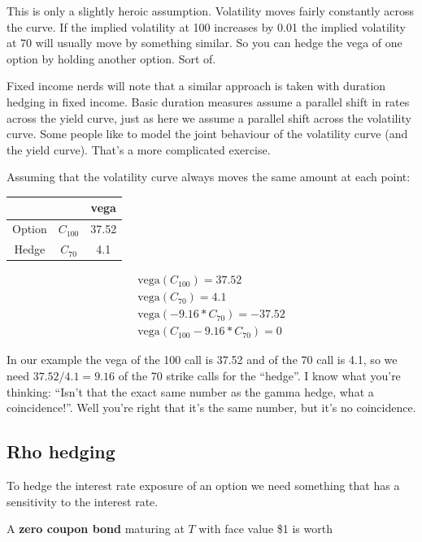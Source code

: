This is only a slightly heroic assumption. Volatility moves fairly constantly across the curve. If the implied volatility at 100 increases by 0.01 the implied volatility at 70 will usually move by something similar. So you can hedge the vega of one option by holding another option. Sort of.

Fixed income nerds will note that a similar approach is taken with duration hedging in fixed income. Basic duration measures assume a parallel shift in rates across the yield curve, just as here we assume a parallel shift across the volatility curve. Some people like to model the joint behaviour of the volatility curve (and the yield curve). That's a more complicated exercise.

Assuming that the volatility curve always moves the same amount at each point:

\begin{center}
\begin{tabular}{|c|cc|}
\hline
 & & vega\\
\hline
Option & $C_{100}$ & 37.52\\
Hedge & $C_{70}$  & 4.1\\
\hline
\end{tabular}
\end{center}

\begin{eqnarray*}
\mbox{vega}(C_{100}) = 37.52\\
\mbox{vega}(C_{70}) = 4.1\\
\mbox{vega}(-9.16*C_{70}) = -37.52\\
\mbox{vega}(C_{100}-9.16*C_{70}) = 0
\end{eqnarray*}


In our example the vega of the 100 call is 37.52 and of the 70 call is 4.1, so we need $37.52/4.1 = 9.16$ of the 70 strike calls for the ``hedge''. I know what you're thinking: ``Isn't that the exact same number as the gamma hedge, what a coincidence!''. Well you're right that it's the same number, but it's no coincidence. 

\subsection{Rho hedging}

To hedge the interest rate exposure of an option we need something that has a sensitivity to the interest rate. 

A \textbf{zero coupon bond} maturing at $T$ with face value \$1 is worth

